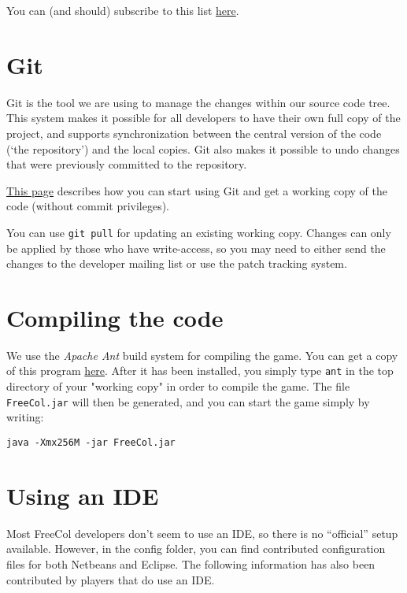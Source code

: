 \documentclass[12pt]{book}
\begin{document}
You can (and should) subscribe to this list
\href{http://lists.sourceforge.net/lists/listinfo/freecol-developers}{here}.


\hypertarget{Git}{\section{Git}}

Git is the tool we are using to manage the changes within our source
code tree.  This system makes it possible for all developers to have
their own full copy of the project, and supports synchronization
between the central version of the code (`the repository') and the
local copies.  Git also makes it possible to undo changes that were
previously committed to the repository.

\href{http://www.freecol.org/documentation/git.html}{This page}
describes how you can start using Git and get a working copy of the
code (without commit privileges).

You can use \verb+git pull+ for updating an existing working
copy.  Changes can only be applied by those who have write-access, so
you may need to either send the changes to the developer mailing list
or use the patch tracking system.


\hypertarget{Compiling the code}{\section{Compiling the code}}

We use the \textit{Apache Ant} build system for compiling the
game. You can get a copy of this program
\href{http://ant.apache.org}{here}. After it has been installed, you
simply type \verb+ant+ in the top directory of your "working copy" in
order to compile the game.  The file \verb+FreeCol.jar+ will then be
generated, and you can start the game simply by writing:

\verb+java -Xmx256M -jar FreeCol.jar+


\hypertarget{Using an IDE}{\section{Using an IDE}}

Most FreeCol developers don't seem to use an IDE, so there is no
``official'' setup available. However, in the config folder, you can
find contributed configuration files for both Netbeans and Eclipse.
The following information has also been contributed by players that do
use an IDE.
\end{document}
